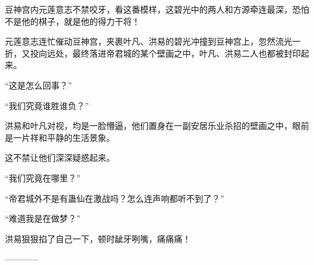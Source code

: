 \begin{this_body}
豆神宫内元莲意志不禁咬牙，看这番模样，这碧光中的两人和方源牵连最深，恐怕不是他的棋子，就是他的得力干将！

元莲意志连忙催动豆神宫，夹裹叶凡、洪易的碧光冲撞到豆神宫上，忽然流光一折，又投向远处，最终落进帝君城的某个壁画之中，叶凡、洪易二人也都被封印起来。

“这是怎么回事？”

“我们究竟谁胜谁负？”

洪易和叶凡对视，均是一脸懵逼，他们置身在一副安居乐业杀招的壁画之中，眼前是一片祥和平静的生活景象。

这不禁让他们深深疑惑起来。

“我们究竟在哪里？”

“帝君城外不是有蛊仙在激战吗？怎么连声响都听不到了？”

“难道我是在做梦？”

洪易狠狠掐了自己一下，顿时龇牙咧嘴，痛痛痛！

------------

\end{this_body}

